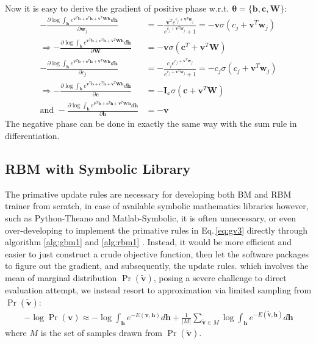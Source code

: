 \documentclass[11pt]{article}
\newcommand{\bs}{\boldsymbol}
\newcommand{\vb}{\boldsymbol{b}}
\newcommand{\vc}{\boldsymbol{c}}
\newcommand{\vh}{\boldsymbol{h}}
\newcommand{\vv}{\boldsymbol{v}}
\newcommand{\vw}{\boldsymbol{w}}
\newcommand{\mw}{\boldsymbol{W}}
\newcommand{\vvt}{\tilde{\vv}}
\newcommand{\pEC}{\boldsymbol{\theta}}
\newcommand{\PDV}[2]{\frac{\partial #1}{\partial #2}}
\begin{document}
{\begin{align*}
\end{align*}
Now it is easy to derive the gradient of positive phase w.r.t. $\pEC=\{\vb, \vc, \mw\}$:
\begin{align*}
  -\PDV{\log{\int_{\vh} e^{\vv^T\vb + \vc^T\vh + \vv^T\mw\vh}} d\vh}{\vw_j}  & = -\frac{\vv^T e^{c_j + \vv^T\vw_j}}{e^{c_j + \vv^T\vw_j}+1} = -\vv\sigma(c_j + \vv^T\vw_j) \\
  \Rightarrow
  -\PDV{\log{\int_{\vh} e^{\vv^T\vb + \vc^T\vh + \vv^T\mw\vh}} d\vh}{\mw}    & = -\vv\sigma(\vc^T + \vv^T\mw) \\
  -\PDV{\log{\int_{\vh} e^{\vv^T\vb + \vc^T\vh + \vv^T\mw\vh}} d\vh}{c_j}    & = -\frac{c_j e^{c_j + \vv^T\vw_j}}{e^{c_j + \vv^T\vw_j}+1} = -c_j\sigma(c_j + \vv^T\vw_j) \\
  \Rightarrow
  -\PDV{\log{\int_{\vh} e^{\vv^T\vb + \vc^T\vh + \vv^T\mw\vh}} d\vh}{\vc}    & = -\bs{I}_{\vc} \sigma(\vc + \vv^T\mw) \\
  \textrm{and }
  -\PDV{\log{\int_{\vh} e^{\vv^T\vb + \vc^T\vh + \vv^T\mw\vh}} d\vh}{\vb}    & = -\vv
\end{align*}
The negative phase can be done in exactly the same way with the sum rule in differentiation.
\subsection{RBM with Symbolic Library}
The primative update rules are necessary for developing both BM and RBM trainer from scratch, in case of available symbolic mathematics libraries however, such as Python-Theano and Matlab-Symbolic, it is often unnecessary, or even over-developing to implement the primative rules in Eq.\,\eqref{eq:gv3} directly through algorithm \eqref{alg:gbm1} and \eqref{alg:rbm1} . Instead, it would be more efficient and easier to just construct a crude objective function, then let the software packages to figure out the gradient, and subsequently, the update rules. 
which involves the mean of marginal distribution $\Pr(\vvt)$, posing a severe challenge to direct evaluation attempt, we instead resort to approximation via limited sampling from $\Pr(\vvt)$:
\begin{align}\label{eq:rbm:gv2}
  -\log{\Pr(\vv)} \approx -\log{\int_{\vh} e^{-E(\vv, \vh)} d\vh} + \frac{1}{|M|}\sum_{\vvt \in M}{\log{\int_{\vh} e^{-E(\vvt, \vh)}d\vh}}
\end{align}
where $M$ is the set of samples drawn from $\Pr(\vvt)$. \\
}
\end{document}
